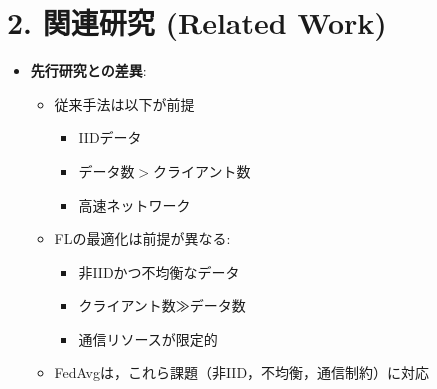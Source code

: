 \documentclass[unicode,12pt,aspectratio=169, dvipdfmx]{beamer}
\begin{document}


\section{2. 関連研究 (Related Work)}
\begin{frame}{\insertsectionhead}
\begin{itemize}
    \item \textbf{先行研究との差異}:
    \begin{itemize}
        \item 従来手法は以下が前提
        \begin{itemize}
        \item IIDデータ
        \item データ数$>$クライアント数
        \item 高速ネットワーク
        \end{itemize}
        \item FLの最適化は前提が異なる:
        \begin{itemize}
        \item 非IIDかつ不均衡なデータ
        \item クライアント数≫データ数
        \item 通信リソースが限定的
        \end{itemize}
        \item FedAvgは，これら課題（非IID，不均衡，通信制約）に対応
    \end{itemize}
\end{itemize}
\end{frame}
\end{document}
